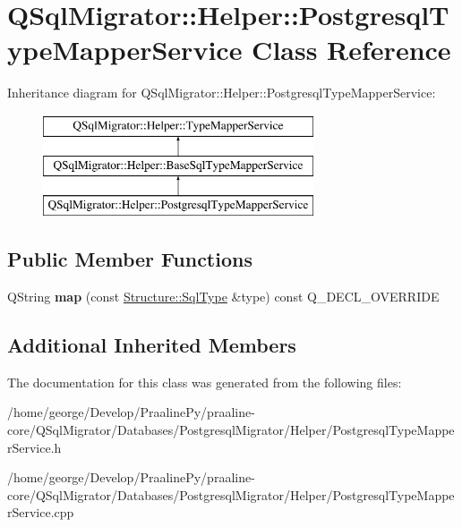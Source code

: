 \hypertarget{class_q_sql_migrator_1_1_helper_1_1_postgresql_type_mapper_service}{}\section{Q\+Sql\+Migrator\+:\+:Helper\+:\+:Postgresql\+Type\+Mapper\+Service Class Reference}
\label{class_q_sql_migrator_1_1_helper_1_1_postgresql_type_mapper_service}
Inheritance diagram for Q\+Sql\+Migrator\+:\+:Helper\+:\+:Postgresql\+Type\+Mapper\+Service\+:\begin{figure}[H]
\begin{center}
\leavevmode
\includegraphics[height=3.000000cm]{class_q_sql_migrator_1_1_helper_1_1_postgresql_type_mapper_service}
\end{center}
\end{figure}
\subsection*{Public Member Functions}
\begin{DoxyCompactItemize}
\item 
\mbox{\label{class_q_sql_migrator_1_1_helper_1_1_postgresql_type_mapper_service_a63e2cd7b0f46ab821d5da05afc2bc6c3}} 
Q\+String {\bfseries map} (const \hyperlink{class_q_sql_migrator_1_1_structure_1_1_sql_type}{Structure\+::\+Sql\+Type} \&type) const Q\+\_\+\+D\+E\+C\+L\+\_\+\+O\+V\+E\+R\+R\+I\+DE
\end{DoxyCompactItemize}
\subsection*{Additional Inherited Members}


The documentation for this class was generated from the following files\+:\begin{DoxyCompactItemize}
\item 
/home/george/\+Develop/\+Praaline\+Py/praaline-\/core/\+Q\+Sql\+Migrator/\+Databases/\+Postgresql\+Migrator/\+Helper/Postgresql\+Type\+Mapper\+Service.\+h\item 
/home/george/\+Develop/\+Praaline\+Py/praaline-\/core/\+Q\+Sql\+Migrator/\+Databases/\+Postgresql\+Migrator/\+Helper/Postgresql\+Type\+Mapper\+Service.\+cpp\end{DoxyCompactItemize}
